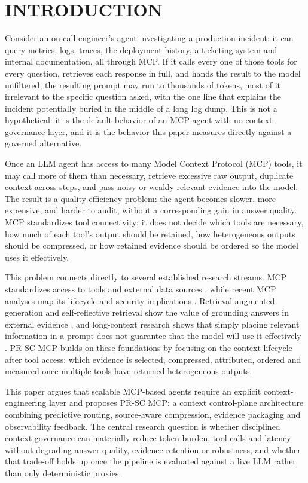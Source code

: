 \section{INTRODUCTION}

Consider an on-call engineer's agent investigating a production incident: it can query metrics, logs, traces, the deployment history, a ticketing system and internal documentation, all through MCP. If it calls every one of those tools for every question, retrieves each response in full, and hands the result to the model unfiltered, the resulting prompt may run to thousands of tokens, most of it irrelevant to the specific question asked, with the one line that explains the incident potentially buried in the middle of a long log dump. This is not a hypothetical: it is the default behavior of an MCP agent with no context-governance layer, and it is the behavior this paper measures directly against a governed alternative.

Once an LLM agent has access to many Model Context Protocol (MCP) tools, it may call more of them than necessary, retrieve excessive raw output, duplicate context across steps, and pass noisy or weakly relevant evidence into the model. The result is a quality-efficiency problem: the agent becomes slower, more expensive, and harder to audit, without a corresponding gain in answer quality. MCP standardizes tool connectivity; it does not decide which tools are necessary, how much of each tool's output should be retained, how heterogeneous outputs should be compressed, or how retained evidence should be ordered so the model uses it effectively.

This problem connects directly to several established research streams. MCP standardizes access to tools and external data sources \cite{Anthropic2024, MCP2025}, while recent MCP analyses map its lifecycle and security implications \cite{Hou2025}. Retrieval-augmented generation and self-reflective retrieval show the value of grounding answers in external evidence \cite{Lewis2020, Asai2024}, and long-context research shows that simply placing relevant information in a prompt does not guarantee that the model will use it effectively \cite{Liu2024a}. PR-SC MCP builds on these foundations by focusing on the context lifecycle after tool access: which evidence is selected, compressed, attributed, ordered and measured once multiple tools have returned heterogeneous outputs.

This paper argues that scalable MCP-based agents require an explicit context-engineering layer and proposes PR-SC MCP: a context control-plane architecture combining predictive routing, source-aware compression, evidence packaging and observability feedback. The central research question is whether disciplined context governance can materially reduce token burden, tool calls and latency without degrading answer quality, evidence retention or robustness, and whether that trade-off holds up once the pipeline is evaluated against a live LLM rather than only deterministic proxies.

